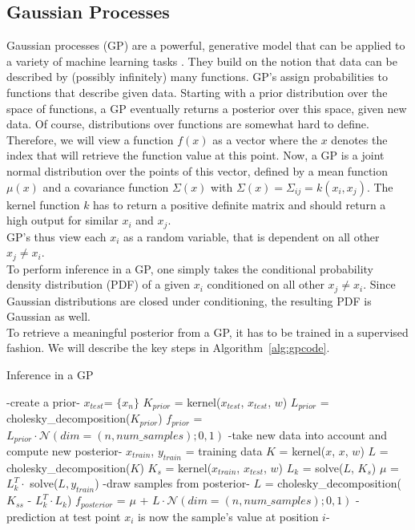 \documentclass[a4paper,cleardoubleempty,BCOR1cm, 11pt]{report}
\begin{document}
\subsection{Gaussian Processes}\label{sec:gp}
Gaussian processes (GP) are a powerful, generative model that can be applied to a variety of machine learning tasks \cite{mackay1998introduction}. They build on the notion that data can be described by (possibly infinitely) many functions. GP's assign probabilities to functions that describe given data. Starting with a prior distribution over the space of functions, a GP eventually returns a posterior over this space, given new data. Of course, distributions over functions are somewhat hard to define. Therefore, we will view a function $f(x)$ as a vector where the $x$ denotes the index that will retrieve the function value at this point. Now, a GP is a joint normal distribution over the points of this vector, defined by a mean function $\mu(x)$ and a covariance function $\Sigma(x)$ with $\Sigma(x) = \Sigma_{ij} = k(x_i,x_j)$. The kernel function $k$ has to return a positive definite matrix and should return a high output for similar $x_i$ and $x_j$.\\
GP's thus view each $x_i$ as a random variable, that is dependent on all other $x_j\neq x_i$.\\
To perform inference in a GP, one simply takes the conditional probability density distribution (PDF) of a given $x_i$ conditioned on all other $x_j\neq x_i$. Since Gaussian distributions are closed under conditioning, the resulting PDF is Gaussian as well.\\
To retrieve a meaningful posterior from a GP, it has to be trained in a supervised fashion. We will describe the key steps in Algorithm~\ref{alg:gpcode}.


\begin{algorithm}
	\caption{Inference in a GP}
	\label{alg:gpcode}
	\begin{algorithmic}
\STATE -create a prior-
\STATE $x_{test}$= $\lbrace x_n \rbrace$
\STATE $K_{prior}$ = kernel($x_{test}$, $x_{test}$, $w$)
\STATE $L_{prior}$ = cholesky\_decomposition($K_{prior}$)
\STATE $f_{prior}$ = $L_{prior} \cdot \mathcal{N}(dim=(n, num\_samples);0,1)$
\STATE
\STATE -take new data into account and compute new posterior-
\STATE $x_{train}$, $y_{train}$ = training data
\STATE $K$ = kernel($x$, $x$, $w$)
\STATE $L$ = cholesky\_decomposition($K$)
\STATE $K_s$ = kernel($x_{train}$, $x_{test}$, $w$)
\STATE $L_k$ = solve($L$, $K_s$)
\STATE $\mu$ = $L_k^T \cdot$ solve($L, y_{train}$)
\STATE
\STATE -draw samples from posterior-
\STATE $L$ = cholesky\_decomposition($K_{ss}$ - $L_k^T \cdot L_k$)
\STATE $f_{posterior}$ = $\mu$ + $L \cdot \mathcal{N}(dim=(n, num\_samples);0,1)$
\STATE - prediction at test point $x_i$ is now the sample's value at position $i$-
	\end{algorithmic}
\end{algorithm}
\end{document}
